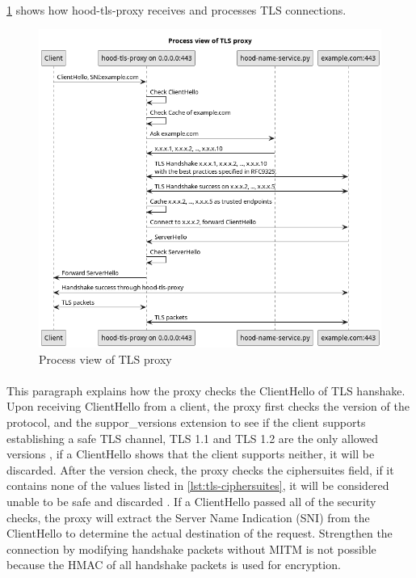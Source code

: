 \documentclass[mscthesis]{usiinfthesis}
\begin{document}
\paragraph{}
\cref{fig:tls-proxy-process-view} shows how hood-tls-proxy receives and processes TLS connections.
\begin{figure}[H]
  \includegraphics[width=\textwidth]{graphics/puml/process-tls-proxy.png}
  \caption{Process view of TLS proxy}
  \label{fig:tls-proxy-process-view}
\end{figure}

\paragraph{}
This paragraph explains how the proxy checks the ClientHello of TLS hanshake. Upon receiving ClientHello from a client, the proxy first checks the version of the protocol, and the suppor\_versions extension to see if the client supports establishing a safe TLS channel, TLS 1.1 and TLS 1.2 are the only allowed versions \citep{rfc:bstprc}, if a ClientHello shows that the client supports neither, it will be discarded. After the version check, the proxy checks the ciphersuites field, if it contains none of the values listed in \cref{lst:tls-ciphersuites}, it will be considered unable to be safe and discarded \citep{rfc:bstprc}. If a ClientHello passed all of the security checks, the proxy will extract the Server Name Indication (SNI) from the ClientHello to determine the actual destination of the request. Strengthen the connection by modifying handshake packets without MITM is not possible because the HMAC of all handshake packets is used for encryption.
\end{document}
